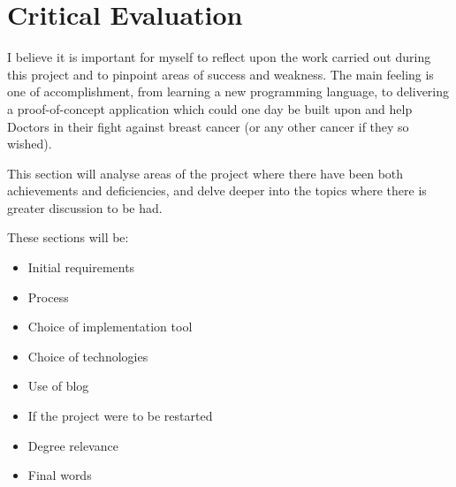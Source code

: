 \chapter{Critical Evaluation}






I believe it is important for myself to reflect upon the work carried out during this project and to pinpoint areas of success and weakness. The main feeling is one of accomplishment, from learning a new programming language, to delivering a proof-of-concept application which could one day be built upon and help Doctors in their fight against breast cancer (or any other cancer if they so wished).

This section will analyse areas of the project where there have been both achievements and deficiencies, and delve deeper into the topics where there is greater discussion to be had.

These sections will be:
\begin{itemize}
  \item Initial requirements
  \item Process
  \item Choice of implementation tool
  \item Choice of technologies
  \item Use of blog
  \item If the project were to be restarted
  \item Degree relevance
  \item Final words
\end{itemize}

